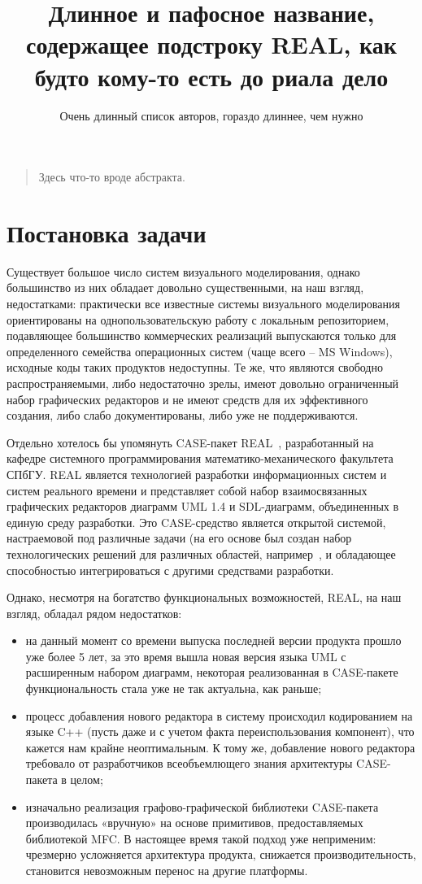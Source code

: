 \documentclass[a5paper]{article}
\title{Длинное и пафосное название, содержащее подстроку REAL, как будто кому-то есть до риала дело}
\author{Очень длинный список авторов, гораздо длиннее, чем нужно}
\date{}
\begin{document}
\maketitle
\thispagestyle{empty}

\begin{quote}
\small\noindent
Здесь что-то вроде абстракта.
\end{quote}

\section{Постановка задачи}
Существует большое число систем визуального моделирования, однако
большинство из них обладает довольно существенными, на наш взгляд,
недостатками: практически все известные системы визуального
моделирования ориентированы на однопользовательскую работу с локальным
репозиторием, подавляющее большинство коммерческих реализаций
выпускаются только для определенного семейства операционных систем
(чаще всего – MS Windows), исходные коды таких продуктов недоступны. Те
же, что являются свободно распространяемыми, либо недостаточно зрелы,
имеют довольно ограниченный набор графических редакторов и не имеют
средств для их эффективного создания, либо слабо документированы, либо
уже не поддерживаются.

Отдельно хотелось бы упомянуть CASE-пакет REAL~\cite{real}, разработанный на
кафедре системного программирования математико-механического факультета
СПбГУ. REAL является технологией разработки информационных систем и
систем реального времени и представляет собой набор взаимосвязанных
графических редакторов диаграмм UML 1.4 и SDL-диаграмм, объединенных в
единую среду разработки. Это CASE-средство является открытой системой,
настраемовой под различные задачи (на его основе был создан набор
технологических решений для различных областей, например~\cite{realIt}, и
обладающее способностью интегрироваться с другими средствами
разработки.

Однако, несмотря на богатство функциональных возможностей,
REAL, на наш взгляд, обладал рядом недостатков:

\begin{itemize}
  \item на данный момент со времени выпуска последней версии продукта прошло уже
    более 5 лет, за это время вышла новая версия языка
	UML с расширенным набором диаграмм,
	некоторая реализованная в CASE-пакете
	функциональность стала уже не так актуальна, как раньше;
  \item процесс добавления нового редактора в систему происходил кодированием на
	языке C++ (пусть даже и с учетом факта
	переиспользования компонент), что кажется нам крайне неоптимальным. К
	тому же, добавление нового редактора требовало от разработчиков
	всеобъемлющего знания архитектуры
	CASE-пакета в целом;
  \item изначально реализация графово-графической библиотеки
	CASE-пакета производилась «вручную» на
	основе примитивов, предоставляемых библиотекой
	MFC. В настоящее время такой подход уже
	неприменим: чрезмерно усложняется архитектура продукта, снижается
	производительность, становится невозможным перенос на другие
	платформы.
\end{itemize}
\end{document}
